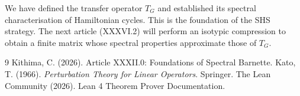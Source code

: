 \documentclass[11pt,a4paper]{article}
\begin{document}
We have defined the transfer operator \(T_G\) and established its spectral characterisation of Hamiltonian cycles. This is the foundation of the SHS strategy. The next article (XXXVI.2) will perform an isotypic compression to obtain a finite matrix whose spectral properties approximate those of \(T_G\).


\begin{thebibliography}{9}
  Kithima, C. (2026). Article XXXII.0: Foundations of Spectral Barnette.
  Kato, T. (1966). \emph{Perturbation Theory for Linear Operators}. Springer.
  The Lean Community (2026). Lean 4 Theorem Prover Documentation.
\end{thebibliography}
\end{document}
